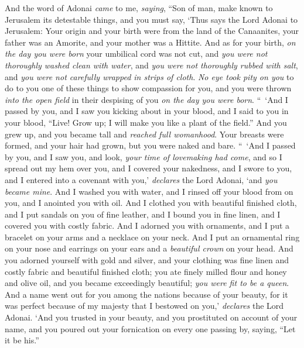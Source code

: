 \begin{biblechapter} %
 And the word of Adonai \textit{came} to me, \textit{saying},
\verse “Son of man, make known to Jerusalem its detestable things,
\verse and you must say, ‘Thus says the Lord Adonai to Jerusalem: Your origin and your birth were from the land of the Canaanites, your father was an Amorite, and your mother was a Hittite.
\verse And as for your birth, \textit{on the day you were born} your umbilical cord was not cut, and \textit{you were not thoroughly washed clean with water}, and \textit{you were not thoroughly rubbed with salt}, and \textit{you were not carefully wrapped in strips of cloth}.
\verse \textit{No eye took pity on you} to do to you one of these things to show compassion for you, and you were thrown \textit{into the open field} in their despising of you \textit{on the day you were born}.
\verse “ ‘And I passed by you, and I saw you kicking about in your blood, and I said to you in your blood, “Live!
\verse Grow up; I will make you like a plant of the field.” And you grew up, and you became tall and \textit{reached full womanhood}. Your breasts were formed, and your hair had grown, but you were naked and bare.
\verse “ ‘And I passed by you, and I saw you, and look, \textit{your time of lovemaking had come}, and so I spread out my hem over you, and I covered your nakedness, and I swore to you, and I entered into a covenant with you,’ \textit{declares} the Lord Adonai, ‘and \textit{you became mine}.
\verse And I washed you with water, and I rinsed off your blood from on you, and I anointed you with oil.
\verse And I clothed you with beautiful finished cloth, and I put sandals on you of fine leather, and I bound you in fine linen, and I covered you with costly fabric.
\verse And I adorned you with ornaments, and I put a bracelet on your arms and a necklace on your neck.
\verse And I put an ornamental ring on your nose and earrings on your ears and a \textit{beautiful crown} on your head.
\verse And you adorned yourself with gold and silver, and your clothing was fine linen and costly fabric and beautiful finished cloth; you ate finely milled flour and honey and olive oil, and you became exceedingly beautiful; \textit{you were fit to be a queen}.
\verse And a name went out for you among the nations because of your beauty, for it was perfect because of my majesty that I bestowed on you,’ \textit{declares} the Lord Adonai.
\verse ‘And you trusted in your beauty, and you prostituted on account of your name, and you poured out your fornication on every one passing by, saying, “Let it be his.”

\end{biblechapter}
